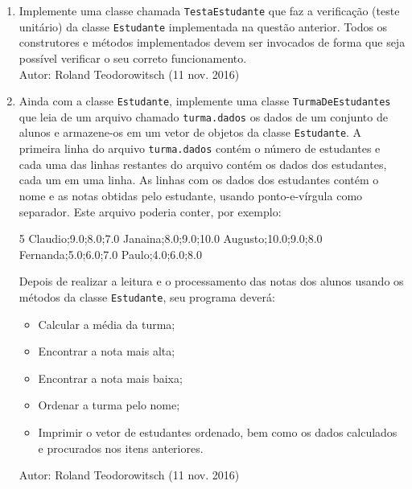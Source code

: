 \documentclass[onecolumn,a4paper,10pt]{report}
\newcommand{\+}{\, + \,}
\newcommand{\<}{\hspace*{-0.4cm}}
\begin{document}
\begin{enumerate}
\item Implemente uma classe chamada \texttt{TestaEstudante} que faz a verificação (teste unitário) da classe \texttt{Estudante} implementada na questão anterior. Todos os construtores e métodos implementados devem ser invocados de forma que seja possível verificar o seu correto funcionamento.\\
{\tiny Autor: Roland Teodorowitsch (11 nov. 2016)}

\item Ainda com a classe \texttt{Estudante}, implemente uma classe \texttt{TurmaDeEstudantes} que leia de um arquivo chamado \texttt{turma.dados} os dados de um conjunto de alunos e armazene-os em um vetor de objetos da classe \texttt{Estudante}. A primeira linha do arquivo \texttt{turma.dados} contém o número de estudantes e cada uma das linhas restantes do arquivo contém os dados dos estudantes, cada um em uma linha. As linhas com os dados dos estudantes contém o nome e as notas obtidas pelo estudante, usando ponto-e-vírgula como separador. Este arquivo poderia conter, por exemplo:\\
\begin{javacode}
5
Claudio;9.0;8.0;7.0
Janaina;8.0;9.0;10.0
Augusto;10.0;9.0;8.0
Fernanda;5.0;6.0;7.0
Paulo;4.0;6.0;8.0
\end{javacode}
Depois de realizar a leitura e o processamento das notas dos alunos usando os métodos da classe \texttt{Estudante}, seu programa deverá:
\begin{itemize}
\item Calcular a média da turma;
\item Encontrar a nota mais alta;
\item Encontrar a nota mais baixa;
\item Ordenar a turma pelo nome;
\item Imprimir o vetor de estudantes ordenado, bem como os dados calculados e procurados nos itens anteriores.
\end{itemize}
{\tiny Autor: Roland Teodorowitsch (11 nov. 2016)}


\end{enumerate}
\end{document}
